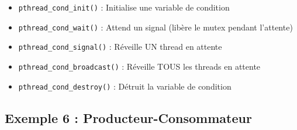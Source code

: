 \documentclass[11pt,a4paper]{article}
\begin{document}
\begin{itemize}
    \item \texttt{pthread\_cond\_init()} : Initialise une variable de condition
    \item \texttt{pthread\_cond\_wait()} : Attend un signal (libère le mutex pendant l'attente)
    \item \texttt{pthread\_cond\_signal()} : Réveille UN thread en attente
    \item \texttt{pthread\_cond\_broadcast()} : Réveille TOUS les threads en attente
    \item \texttt{pthread\_cond\_destroy()} : Détruit la variable de condition
\end{itemize}

\subsection{Exemple 6 : Producteur-Consommateur}
\end{document}
